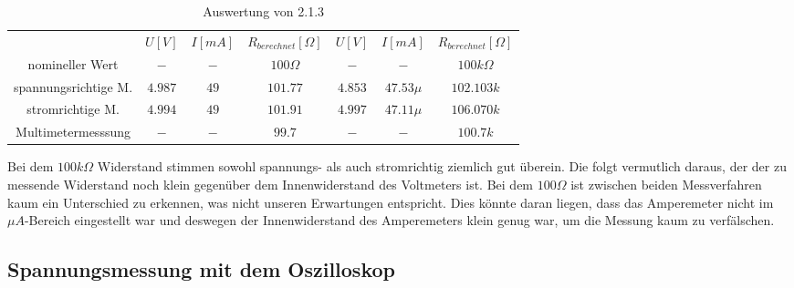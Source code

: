 \documentclass[a4paper,12pt]{article}
\begin{document}
	\begin{table}[h]
		\centering
		\begin{tabular}{|c|c|c|c|c|c|c|}
			\hline
			\multirow{2}{*}{} & \multirow{2}{*}{$U[V]$} & \multirow{2}{*}{$I[mA]$} & \multirow{2}{*}{$R_{berechnet}[\Omega]$} & \multirow{2}{*}{$U[V]$} & \multirow{2}{*}{$I[mA]$} & \multirow{2}{*}{$R_{berechnet}[\Omega]$} \\
			&  &  &  &  &  &  \\ \hline
			\multirow{2}{*}{nomineller Wert} & \multirow{2}{*}{$-$} & \multirow{2}{*}{$-$} & \multirow{2}{*}{$100\Omega$} & \multirow{2}{*}{$-$} & \multirow{2}{*}{$-$} & \multirow{2}{*}{$100k\Omega$} \\
			&  &  &  &  &  &  \\ \hline
			\multirow{2}{*}{spannungsrichtige M.} & \multirow{2}{*}{$4.987$} & \multirow{2}{*}{$49$} & \multirow{2}{*}{$101.77$} & \multirow{2}{*}{$4.853$} & \multirow{2}{*}{$47.53\mu$} & \multirow{2}{*}{$102.103k$} \\
			&  &  &  &  &  &  \\ \hline
			\multirow{2}{*}{stromrichtige M.} & \multirow{2}{*}{$4.994$} & \multirow{2}{*}{$49$} & \multirow{2}{*}{$101.91$} & \multirow{2}{*}{$4.997$} & \multirow{2}{*}{$47.11\mu$} & \multirow{2}{*}{$106.070k$} \\
			&  &  &  &  &  &  \\ \hline
			\multirow{2}{*}{Multimetermesssung} & \multirow{2}{*}{$-$} & \multirow{2}{*}{$-$} & \multirow{2}{*}{$99.7$} & \multirow{2}{*}{$-$} & \multirow{2}{*}{$-$} & \multirow{2}{*}{$100.7k$} \\
			&  &  &  &  &  &  \\ \hline
		\end{tabular}
		\caption{Auswertung von 2.1.3}
	\end{table}
	\newline
	Bei dem $100k\Omega$ Widerstand stimmen sowohl spannungs- als auch stromrichtig ziemlich  gut überein. Die folgt vermutlich daraus, der der zu messende Widerstand noch klein gegenüber dem Innenwiderstand des Voltmeters ist. Bei dem $100\Omega$ ist zwischen beiden Messverfahren kaum ein Unterschied zu erkennen, was nicht unseren Erwartungen entspricht. Dies könnte daran liegen, dass das Amperemeter nicht im $\mu A$-Bereich eingestellt war und deswegen der Innenwiderstand des Amperemeters klein genug war, um die Messung kaum zu verfälschen.
	\newpage
	\subsection{Spannungsmessung mit dem Oszilloskop}
\end{document}
